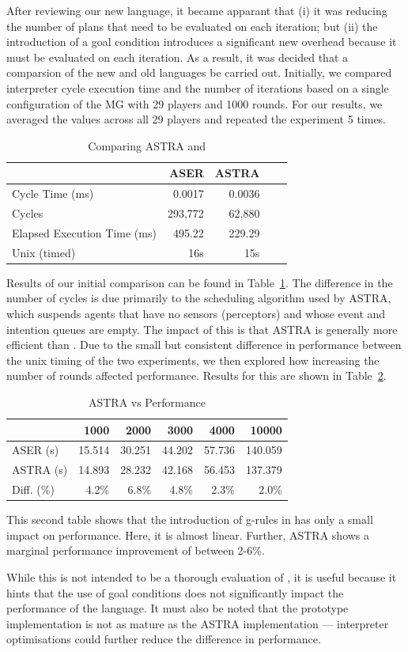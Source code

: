 After reviewing our new language, it became apparant that (i) it was reducing the number of plans 
that need to be evaluated on each iteration; but (ii) the introduction of a goal condition introduces
a significant new overhead because it must be evaluated on each iteration.
As a result, it was decided that a comparsion of the new and old languages be carried out. Initially,
we compared interpreter cycle execution time and the number of iterations based on a single 
configuration of the MG with 29 players and 1000 rounds. For our results, we averaged
the values across all 29 players and repeated the experiment 5 times.

\begin{table}[]
\centering
\caption{Comparing ASTRA and {\aser}}
\label{comparison}
\begin{tabular}{lrrrr}
                            & ASER    & ASTRA  \\ \toprule
Cycle Time (ms)             & 0.0017  & 0.0036 \\
Cycles                      & 293,772 & 62,880 \\
Elapsed Execution Time (ms) & 495.22  & 229.29 \\
Unix (timed)                & 16s     & 15s   
\end{tabular}
\end{table}

Results of our initial comparison can be found in Table~\ref{comparison}. The difference
in the number of cycles is due primarily to the scheduling algorithm used by ASTRA, which
suspends agents that have no sensors (perceptors) and whose event and intention queues are empty.
The impact of this is that ASTRA is generally more efficient than {\aser}. Due to the small but 
consistent difference in performance between the unix timing of the two experiments, we then 
explored how increasing the number of rounds affected performance. Results for this are shown 
in Table~\ref{rounds}.

\begin{table}[]
\centering
\caption{ASTRA vs {\aser} Performance}
\label{rounds}
\begin{tabular}{lrrrrr}
           & 1000   & 2000   & 3000   & 4000   & 10000   \\ \toprule
ASER (s)   & 15.514 & 30.251 & 44.202 & 57.736 & 140.059 \\
ASTRA (s)  & 14.893 & 28.232 & 42.168 & 56.453 & 137.379 \\
Diff. (\%) & 4.2\%  & 6.8\%  & 4.8\%  & 2.3\%  & 2.0\%  
\end{tabular}
\end{table}

This second table shows that the introduction of g-rules in {\aser} has only a small impact on 
performance. Here, it is almost linear. Further, ASTRA shows a marginal performance improvement of between 2-6\%.

While this is not intended to be a thorough evaluation of {\aser}, it is useful because
it hints that the use of goal conditions does not significantly impact the performance 
of the language. It must also be noted that the prototype implementation is not as mature 
as the ASTRA implementation --- interpreter optimisations could further reduce the difference 
in performance.
